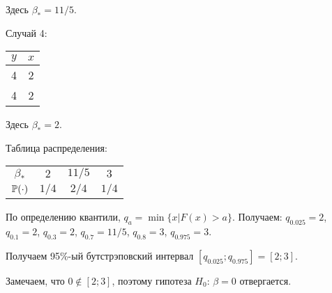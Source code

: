 \begin{problem}
\begin{sol}
Здесь $\beta_* = 11/5$.

Случай 4:

\begin{tabular}{cc}
\toprule
$y$ & $x$ \\
\midrule
 4 & 2 \\
 4 & 2 \\
\bottomrule
\end{tabular}

Здесь $\beta_* = 2$.

Таблица распределения:

\begin{tabular}{c|ccc}
\toprule
$\beta_*$ & $2$ & $11/5$ & $3$ \\
$\P(\cdot)$ & $1/4$ & $2/4$ & $1/4$ \\
\bottomrule
\end{tabular}

По определению квантили, $q_a = \min \{x | F(x) > a \}$. Получаем: $q_{0.025} = 2$, $q_{0.1} = 2$, $q_{0.3} = 2$, $q_{0.7} = 11/5$, $q_{0.8} = 3$, $q_{0.975} = 3$.


Получаем 95\%-ый бутстрэповский интервал $[q_{0.025}; q_{0.975}]=[2;3]$.


Замечаем, что $0 \notin [2;3]$, поэтому гипотеза $H_0$: $\beta = 0$ отвергается.

\end{sol}
\end{problem}




